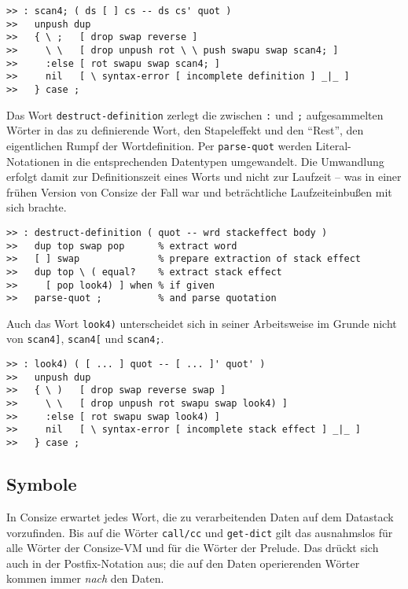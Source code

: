 \begin{verbatim}
>> : scan4; ( ds [ ] cs -- ds cs' quot )
>>   unpush dup
>>   { \ ;   [ drop swap reverse ]
>>     \ \   [ drop unpush rot \ \ push swapu swap scan4; ]
>>     :else [ rot swapu swap scan4; ]
>>     nil   [ \ syntax-error [ incomplete definition ] _|_ ]
>>   } case ;
\end{verbatim}

Das Wort \verb|destruct-definition| zerlegt die zwischen \verb|:| und \verb|;| aufgesammelten Wörter in das zu definierende Wort, den Stapeleffekt und den "`Rest"', den eigentlichen Rumpf der Wortdefinition. Per \verb|parse-quot| werden Literal-Notationen in die entsprechenden Datentypen umgewandelt. Die Umwandlung erfolgt damit zur Definitionszeit eines Worts und nicht zur Laufzeit -- was in einer frühen Version von Consize der Fall war und beträchtliche Laufzeiteinbußen mit sich brachte.

\begin{verbatim}  
>> : destruct-definition ( quot -- wrd stackeffect body ) 
>>   dup top swap pop      % extract word
>>   [ ] swap              % prepare extraction of stack effect
>>   dup top \ ( equal?    % extract stack effect
>>     [ pop look4) ] when % if given
>>   parse-quot ;          % and parse quotation
\end{verbatim}

Auch das Wort \verb|look4)| unterscheidet sich in seiner Arbeitsweise im Grunde nicht von \verb|scan4]|, \verb|scan4[| und \verb|scan4;|.

\begin{verbatim} 
>> : look4) ( [ ... ] quot -- [ ... ]' quot' )
>>   unpush dup
>>   { \ )   [ drop swap reverse swap ]
>>     \ \   [ drop unpush rot swapu swap look4) ]
>>     :else [ rot swapu swap look4) ]
>>     nil   [ \ syntax-error [ incomplete stack effect ] _|_ ]
>>   } case ;
\end{verbatim}
  
\subsection{Symbole}
\label{Sec:DefSymbols}

In Consize erwartet jedes Wort, die zu verarbeitenden Daten auf dem Datastack vorzufinden. Bis auf die Wörter \verb|call/cc| und \verb|get-dict| gilt das ausnahmslos für alle Wörter der Consize-VM und für die Wörter der Prelude. Das drückt sich auch in der Postfix-Notation aus; die auf den Daten operierenden Wörter kommen immer \emph{nach} den Daten.


